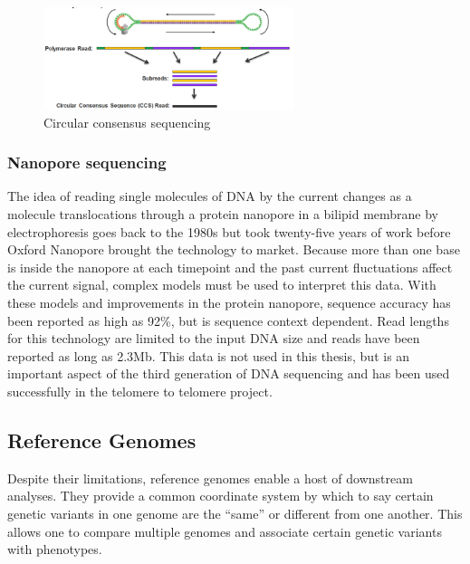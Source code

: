 \begin{figure}[htbp!]
\caption{Circular consensus sequencing}
\label{figure:ccs}
\begin{centering}
\includegraphics[width=0.65\textwidth]{CCS.png}
\end{centering}
\end{figure}

\subsubsection{Nanopore sequencing}

\par{
The idea of reading single molecules of DNA by the current changes as a molecule translocations through a protein nanopore in a bilipid membrane by electrophoresis goes back to the 1980s\cite{nanopore1} but took twenty-five years of work before Oxford Nanopore brought the technology to market\cite{nanopore2}\cite{nanopore3}. Because more than one base is inside the nanopore at each timepoint and the past current fluctuations affect the current signal, complex models must be used to interpret this data\cite{nanocall}\cite{deepnano}. With these models and improvements in the protein nanopore, sequence accuracy has been reported as high as 92\%, but is sequence context dependent. Read lengths for this technology are limited to the input DNA size and reads have been reported as long as 2.3Mb\cite{longlong}\cite{ultralong2}. This data is not used in this thesis, but is an important aspect of the third generation of DNA sequencing and has been used successfully in the telomere to telomere project\cite{T2T2}.
}

\subsection{Reference Genomes}

\par{
Despite their limitations, reference genomes enable a host of downstream analyses. They provide a common coordinate system by which to say certain genetic variants in one genome are the ``same'' or different from one another\cite{GRCh38}. This allows one to compare multiple genomes and associate certain genetic variants with phenotypes.
}

